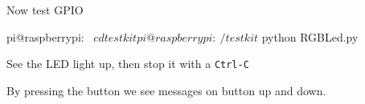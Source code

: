 \begin{frame}
   {Now test GPIO}

   \begin{raw}
pi@raspberrypi:~ $ cd testkit
pi@raspberrypi:~/testkit $ python RGBLed.py 
   \end{raw}

See the LED light up, then stop it with a \verb?Ctrl-C?


By pressing the button we see messages on button up and down.

\end{frame}

\cprotect\note{


}

